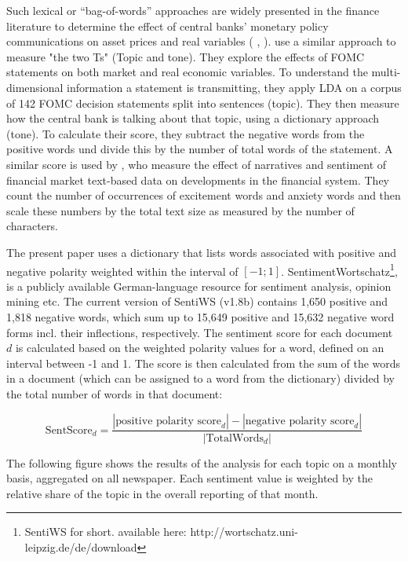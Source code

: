 \documentclass[12pt,a4paper,notitlepage]{article}
\begin{document}
Such lexical or “bag-of-words” approaches are widely presented in the finance literature to  determine  the  effect  of  central  banks’  monetary  policy  communications on asset prices and real variables (\citet{nyman_news_2018} \citep{tetlock_giving_2007}, \citep{tetlock_more_2008}). \citet{hansen_shocking_2016} use a similar approach to measure "the two Ts" (Topic and tone). They explore the effects of FOMC statements on both market and real economic variables. To understand the multi-dimensional information a statement is transmitting, they apply LDA on a corpus of 142 FOMC decision statements split into sentences (topic). They then measure how the central bank is talking about that topic, using a dictionary approach (tone). To calculate their score, they subtract the negative words from the positive words und divide this by the number of total words of the statement. A similar score is used by \citet{nyman_news_2018}, who measure the effect of narratives and sentiment of financial market text-based data on developments in the financial system. They count the number of occurrences of excitement words and anxiety words and then scale these numbers by the total text size as measured by the number of characters.

The present paper uses a dictionary that lists words associated with positive and negative polarity weighted within the interval of $[-1; 1]$. SentimentWortschatz\footnote{SentiWS for short. available here: http://wortschatz.uni-leipzig.de/de/download}, is a publicly available German-language resource for sentiment analysis, opinion mining etc. The current version of SentiWS (v1.8b) contains 1,650 positive and 1,818 negative words, which sum up to 15,649 positive and 15,632 negative word forms incl. their inflections, respectively. The sentiment score for each document $d$ is calculated  based on the weighted polarity values for a word, defined on an interval between -1 and 1. The score is then calculated from the sum of the words in a document (which can be assigned to a word from the dictionary) divided by the total number of words in that document:
 
\begin{equation}
	\text{SentScore}_d = \frac{|\text{positive polarity score}_d| - |\text{negative polarity score}_d|}{|\text{TotalWords}_d|}
\end{equation}

The following figure shows the results of the analysis for each topic on a monthly basis, aggregated on all newspaper. Each sentiment value is weighted by the relative share of the topic in the overall reporting of that month.
\end{document}
